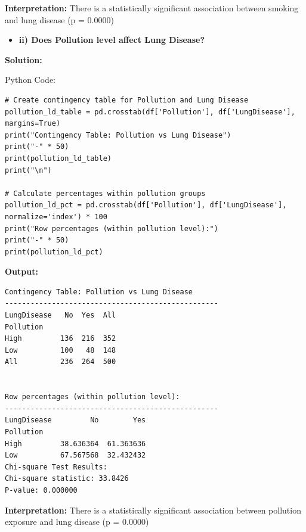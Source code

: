\documentclass[12pt]{article}
\begin{document}
\vspace{0.4cm}

\textbf{Interpretation:}
There is a statistically significant association between smoking and lung disease (p = 0.0000)

\vspace{0.3cm}

\begin{itemize}
    \item\textbf{ii) Does Pollution level affect Lung Disease?}
\end{itemize}

{\large\textbf{Solution:}}

\vspace{0.1cm}

{\large{Python Code:}}

\vspace{0.2cm}

\begin{verbatim}
# Create contingency table for Pollution and Lung Disease
pollution_ld_table = pd.crosstab(df['Pollution'], df['LungDisease'], margins=True)
print("Contingency Table: Pollution vs Lung Disease")
print("-" * 50)
print(pollution_ld_table)
print("\n")

# Calculate percentages within pollution groups
pollution_ld_pct = pd.crosstab(df['Pollution'], df['LungDisease'], normalize='index') * 100
print("Row percentages (within pollution level):")
print("-" * 50)
print(pollution_ld_pct)
\end{verbatim}

\vspace{1cm}

\textbf{Output:}

\begin{verbatim}
Contingency Table: Pollution vs Lung Disease
--------------------------------------------------
LungDisease   No  Yes  All
Pollution                 
High         136  216  352
Low          100   48  148
All          236  264  500


Row percentages (within pollution level):
--------------------------------------------------
LungDisease         No        Yes
Pollution                        
High         38.636364  61.363636
Low          67.567568  32.432432
Chi-square Test Results:
Chi-square statistic: 33.8426
P-value: 0.000000
\end{verbatim}

\vspace{0.4cm}

\textbf{Interpretation:}
There is a statistically significant association between pollution exposure and lung disease (p = 0.0000)
\vspace{1cm}
\end{document}
